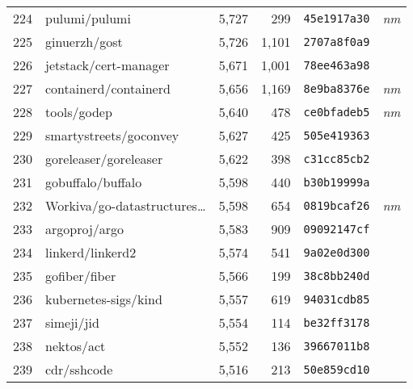 {\begin{supertabular}{llrrll}
        224 &                      pulumi/pulumi &  5,727 &    299 &  \texttt{45e1917a30} &  \textit{nm} \\
        225 &                      ginuerzh/gost &  5,726 &  1,101 &  \texttt{2707a8f0a9} &              \\
        226 &              jetstack/cert-manager &  5,671 &  1,001 &  \texttt{78ee463a98} &              \\
        227 &              containerd/containerd &  5,656 &  1,169 &  \texttt{8e9ba8376e} &  \textit{nm} \\
        228 &                        tools/godep &  5,640 &    478 &  \texttt{ce0bfadeb5} &  \textit{nm} \\
        229 &             smartystreets/goconvey &  5,627 &    425 &  \texttt{505e419363} &              \\
        230 &              goreleaser/goreleaser &  5,622 &    398 &  \texttt{c31cc85cb2} &              \\
        231 &                  gobuffalo/buffalo &  5,598 &    440 &  \texttt{b30b19999a} &              \\
        232 &    Workiva/go-datastructures\ldots &  5,598 &    654 &  \texttt{0819bcaf26} &  \textit{nm} \\
        233 &                      argoproj/argo &  5,583 &    909 &  \texttt{09092147cf} &              \\
        234 &                   linkerd/linkerd2 &  5,574 &    541 &  \texttt{9a02e0d300} &              \\
        235 &                      gofiber/fiber &  5,566 &    199 &  \texttt{38c8bb240d} &              \\
        236 &               kubernetes-sigs/kind &  5,557 &    619 &  \texttt{94031cdb85} &              \\
        237 &                         simeji/jid &  5,554 &    114 &  \texttt{be32ff3178} &              \\
        238 &                         nektos/act &  5,552 &    136 &  \texttt{39667011b8} &              \\
        239 &                        cdr/sshcode &  5,516 &    213 &  \texttt{50e859cd10} &              \\

\end{supertabular}}
